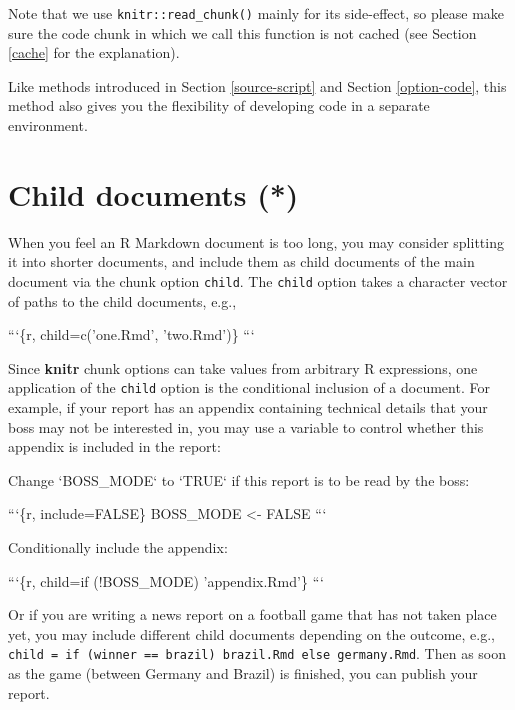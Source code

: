 \documentclass[
  11pt,
]{krantz}
\newenvironment{Shaded}{\begin{snugshade}}{\end{snugshade}}
\newcommand{\BaseNTok}[1]{\textcolor[rgb]{0.06,0.06,0.06}{#1}}
\newcommand{\NormalTok}[1]{#1}
\begin{document}
Note that we use \texttt{knitr::read\_chunk()} mainly for its side-effect, so please make sure the code chunk in which we call this function is not cached (see Section \ref{cache} for the explanation).

Like methods introduced in Section \ref{source-script} and Section \ref{option-code}, this method also gives you the flexibility of developing code in a separate environment.

\hypertarget{child-document}{%
\section{Child documents (*)}\label{child-document}}

When you feel an R Markdown document is too long, you may consider splitting it into shorter documents, and include them as child documents of the main document via the chunk option \texttt{child}. The \texttt{child} option takes a character vector of paths to the child documents, e.g.,

\begin{Shaded}
\begin{Highlighting}[]
\BaseNTok{```\{r, child=c('one.Rmd', 'two.Rmd')\}}
\BaseNTok{```}
\end{Highlighting}
\end{Shaded}

Since \textbf{knitr} chunk options can take values from arbitrary R expressions, one application of the \texttt{child} option is the conditional inclusion of a document. For example, if your report has an appendix containing technical details that your boss may not be interested in, you may use a variable to control whether this appendix is included in the report:

\begin{Shaded}
\begin{Highlighting}[]
\NormalTok{Change }\BaseNTok{`BOSS_MODE`}\NormalTok{ to }\BaseNTok{`TRUE`}\NormalTok{ if this report is to be read}
\NormalTok{by the boss:}

\BaseNTok{```\{r, include=FALSE\}}
\BaseNTok{BOSS_MODE <- FALSE}
\BaseNTok{```}

\NormalTok{Conditionally include the appendix:}

\BaseNTok{```\{r, child=if (!BOSS_MODE) 'appendix.Rmd'\}}
\BaseNTok{```}
\end{Highlighting}
\end{Shaded}

Or if you are writing a news report on a football game that has not taken place yet, you may include different child documents depending on the outcome, e.g., \texttt{child\ =\ if\ (winner\ ==\ \textquotesingle{}brazil\textquotesingle{})\ \textquotesingle{}brazil.Rmd\textquotesingle{}\ else\ \textquotesingle{}germany.Rmd\textquotesingle{}}. Then as soon as the game (between Germany and Brazil) is finished, you can publish your report.
\end{document}
